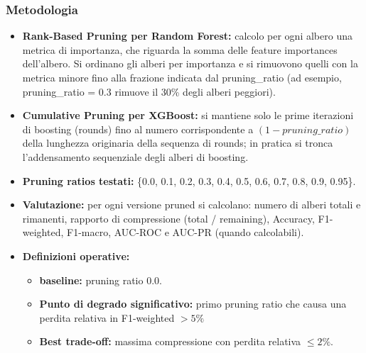 \documentclass[a4paper,12pt]{report}
\begin{document}
	\subsubsection{Metodologia}
	\begin{itemize}
		\item \textbf{Rank-Based Pruning per Random Forest:} calcolo per ogni albero una metrica di importanza, che riguarda la somma delle feature importances dell'albero. Si ordinano gli alberi per importanza e si rimuovono quelli con la metrica minore fino alla frazione indicata dal pruning\_ratio (ad esempio, pruning\_ratio = 0.3 rimuove il 30\% degli alberi peggiori).
		\item \textbf{Cumulative Pruning per XGBoost:} si mantiene solo le prime iterazioni di boosting (rounds) fino al numero corrispondente a \((1 - pruning\_ratio)\) della lunghezza originaria della sequenza di rounds; in pratica si tronca l'addensamento sequenziale degli alberi di boosting.
		\item \textbf{Pruning ratios testati:} \{0.0, 0.1, 0.2, 0.3, 0.4, 0.5, 0.6, 0.7, 0.8, 0.9, 0.95\}.
		\item \textbf{Valutazione:} per ogni versione pruned si calcolano: numero di alberi totali e rimanenti, rapporto di compressione (total / remaining), Accuracy, F1-weighted, F1-macro, AUC-ROC e AUC-PR (quando calcolabili).
		\item \textbf{Definizioni operative:}
		\begin{itemize}
			\item \textbf{baseline:} pruning ratio 0.0.
			\item \textbf{Punto di degrado significativo:} primo pruning ratio che causa una perdita relativa in F1-weighted $>5\%$
			\item \textbf{Best trade-off:} massima compressione con perdita relativa $\leq 2\%$.
		\end{itemize}
	\end{itemize}
	
\end{document}
